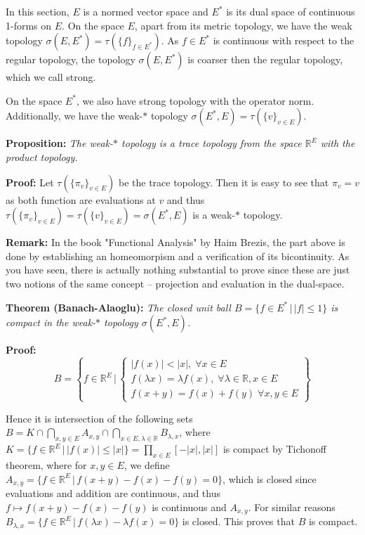 \vspace{1ex}
In this section, $E$ is a normed vector space and $E^*$ is its dual space of continuous
1-forms on $E$. On the space $E$, apart from its metric topology, we have
the weak topology $\sigma(E, E^*)=\tau(\{f\}_{f\in E^*})$. As $f\in E^*$ is
continuous with respect to the regular topology, the topology $\sigma(E, E^*)$
is coarser then the regular topology, which we call strong.
\vspace{1ex}

On the space $E^*$, we also have strong topology with the operator norm.
Additionally, we have the weak-$*$ topology $\sigma(E^*, E)=\tau(\{v\}_{v\in E})$.

\vspace{1ex}
\textbf{Proposition:} \textit{The weak-$*$ topology is a trace topology from the space
$\mathbb{R}^E$ with the product topology.}

\vspace{1ex}
\textbf{Proof:} Let $\tau(\{\pi_v\}_{v\in E})$ be the trace topology. Then it
is easy to see that $\pi_v=v$ as both function are evaluations at $v$ and thus
$\tau(\{\pi_v\}_{v\in E})=\tau(\{v\}_{v\in E})=\sigma(E^*, E)$ is a weak-$*$
topology.

\vspace{1ex}
\textbf{Remark:} In the book "Functional Analysis" by Haim Brezis, the part
above is done by establishing an homeomorpism and a verification of its bicontinuity.
As you have seen, there is actually nothing substantial to prove since these are 
just two notions of the same concept – projection and evaluation in the dual-space.

\vspace{1ex}
\textbf{Theorem (Banach-Alaoglu):} \textit{The closed unit ball $B=\{f\in E^*\,|\,|
f|\leq 1\}$ is compact in the weak-$*$ topology $\sigma(E^*, E)$.}

\vspace{1ex}
\textbf{Proof:}
\[ B=\left\{f\in\mathbb{R}^E\,|\,
\begin{cases}
    |f(x)|<|x|,\;\forall x\in E\\
    f(\lambda x)=\lambda f(x),\;\forall\lambda\in\mathbb{R}, x\in E\\
    f(x+y)=f(x)+f(y)\;\forall x,y\in E
\end{cases}
\right\} \] 

Hence it is intersection of the following sets $B=K\cap\bigcap_{x,y\in E} A_{x,y}
\cap\bigcap_{x\in E, \lambda\in\mathbb{R}}B_{\lambda,x}$, where $K=\{f\in\mathbb
{R}^E\,|\,|f(x)|\leq|x|\}=\prod_{x\in E}[-|x|, |x|]$ is compact by Tichonoff
theorem, where for $x,y\in E$, we define $A_{x,y}=\{f\in\mathbb{R}^E\,|\,f(x+y)-
f(x)-f(y)=0\}$, which is closed since evaluations and addition are continuous, and
thus $f\mapsto f(x+y)-f(x)-f(y)$ is continuous and $A_{x,y}$. For similar
reasons $B_{\lambda, x}=\{f\in\mathbb{R}^E\,|\,f(\lambda x)-\lambda f(x)=0\}$ is
closed. This proves that $B$ is compact.

